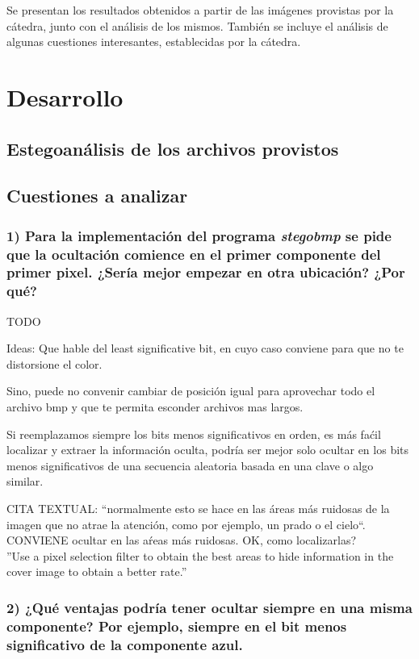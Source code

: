 \documentclass[a4paper,10pt]{article}
\begin{document}
Se presentan los resultados obtenidos a partir de las imágenes provistas por la cátedra, junto con el análisis de los mismos.
También se incluye el análisis de algunas cuestiones interesantes, establecidas por la cátedra.

\section{Desarrollo}

\subsection{Estegoanálisis de los archivos provistos}

\subsection{Cuestiones a analizar}

\subsubsection*{ 1) Para la implementación del programa \textit{stegobmp} se pide que la ocultación comience en el
primer componente del primer pixel. ¿Sería mejor empezar en otra ubicación? ¿Por qué?}

TODO

Ideas: Que hable del least significative bit, en cuyo caso conviene para que no te distorsione el color.

Sino, puede no convenir cambiar de posición igual para aprovechar todo el archivo bmp y que te permita esconder archivos mas largos.

Si reemplazamos siempre los bits menos significativos en orden, es más faćil localizar y extraer la información oculta, podría ser mejor solo ocultar 
en los bits menos significativos de una secuencia aleatoria basada en una clave o algo similar.

CITA TEXTUAL: ``normalmente esto se hace en las áreas más ruidosas de la imagen que no atrae la atención, como
por ejemplo, un prado o el cielo``.
CONVIENE  ocultar en las aŕeas más ruidosas. OK, como localizarlas?\\
''Use a pixel selection filter to obtain the best areas
to hide information in the cover image to obtain
a better rate.''



\subsubsection*{ 2) ¿Qué ventajas podría tener ocultar siempre en una misma componente? Por ejemplo, siempre
en el bit menos significativo de la componente azul.}
\end{document}
